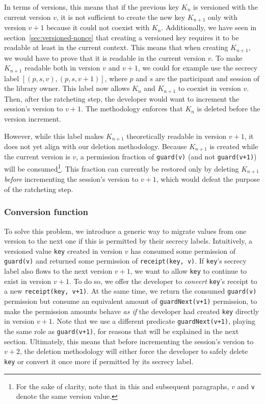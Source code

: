 In terms of versions, this means that if the previous key $K_n$ is versioned with the current version $v$, it is not sufficient to create the new key $K_{n+1}$ only with version $v+1$ because it could not coexist with $K_n$.
Additionally, we have seen in section~\ref{sec:versioned-nonce} that creating a versioned key requires it to be readable at least in the current context. This means that when creating $K_{n+1}$, we would have to prove that it is readable in the current version $v$. To make $K_{n+1}$ readable both in version $v$ and $v+1$, we could for example use the secrecy label $[(p,s,v), (p,s,v+1)]$, where $p$ and $s$ are the participant and session of the library owner.
This label now allows $K_n$ and $K_{n+1}$ to coexist in version $v$.
Then, after the ratcheting step, the developer would want to increment the session's version to $v+1$. The methodology enforces that $K_n$ is deleted before the version increment.

However, while this label makes $K_{n+1}$ theoretically readable in version $v+1$, it does not yet align with our deletion methodology. Because $K_{n+1}$ is created while the current version is $v$, a permission fraction of \texttt{guard(v)} (and not \texttt{guard(v+1)}) will be consumed\footnote{For the sake of clarity, note that in this and subsequent paragraphs, $v$ and \texttt{v} denote the same version value.}. This fraction can currently be restored only by deleting $K_{n+1}$ \emph{before} incrementing the session's version to $v+1$, which would defeat the purpose of the ratcheting step.

\subsubsection{Conversion function}
\label{sec:conversion-function}

To solve this problem, we introduce a generic way to migrate values from one version to the next one if this is permitted by their secrecy labels.
Intuitively, a versioned value \texttt{key} created in version $v$ has consumed some permission of \texttt{guard(v)} and returned some permission of \texttt{receipt(key, v)}.
If \texttt{key}'s secrecy label also flows to the next version $v+1$, we want to allow \texttt{key} to continue to exist in version $v+1$.
To do so, we offer the developer to \emph{convert} \texttt{key}'s receipt to a new \texttt{receipt(key, v+1)}. At the same time, we return the consumed \texttt{guard(v)} permission but consume an equivalent amount of \texttt{guardNext(v+1)} permission, to make the permission amounts behave \emph{as if} the developer had created \texttt{key} directly in version $v+1$.
Note that we use a different predicate \texttt{guardNext(v+1)}, playing the same role as \texttt{guard(v+1)}, for reasons that will be explained in the next section.
Ultimately, this means that before incrementing the session's version to $v+2$, the deletion methodology will either force the developer to safely delete \texttt{key} or convert it once more if permitted by its secrecy label.

